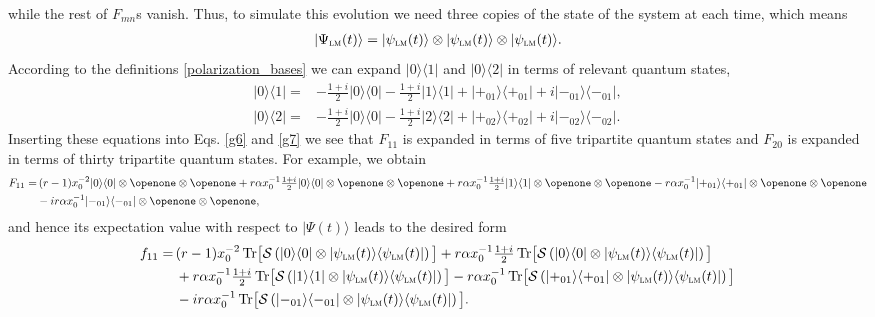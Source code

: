 \documentclass[aps,pra,twocolumn,floatfix,groupedaddress,superscriptaddress,nofootinbib,notitlepage]{revtex4-2}
\begin{document}
while the rest of $F_{mn}$s vanish. 
Thus, to simulate this evolution we need three copies of the state of the system at each time, which means
\begin{align}
|\Psi_{\textsc{lm}} (t) \rangle = |\psi_{\textsc{lm}}(t)\rangle \otimes |\psi_{\textsc{lm}}(t)\rangle \otimes |\psi_{\textsc{lm}}(t)\rangle.
\end{align}
According to the definitions \eqref{polarization_bases} we can expand $|0\rangle\langle 1|$ and $|0\rangle\langle 2|$ in terms of relevant quantum states,
\begin{align}
|0\rangle\langle 1|=&-\textstyle{\frac{1+i}{2}} |0 \rangle \langle 0| -\frac{1+i}{2} |1\rangle\langle 1| + |+_{01} \rangle \langle +_{01}| + i |-_{01}\rangle  \langle -_{01} |,\nonumber\\
|0\rangle\langle 2|=& -\textstyle{\frac{1+i}{2}} |0 \rangle \langle 0| -\frac{1+i}{2} |2\rangle \langle 2| + |+_{02} \rangle \langle +_{02}| + i |-_{02} \rangle \langle -_{02}|.
\end{align}
Inserting these equations into Eqs. \eqref{g6} and \eqref{g7} we see that $F_{11}$ is expanded in terms of five tripartite quantum states and $F_{20}$ is expanded in terms of thirty tripartite quantum states. For example, we obtain
\begin{align}
F_{11} = & \, (r-1) x_{0}^{-2}|0 \rangle \langle 0|\otimes \openone\otimes \openone +r \alpha x_{0}^{-1} \textstyle{\frac{1+i}{2}} |0\rangle \langle 0| \otimes \openone\otimes \openone + r \alpha x_{0}^{-1} \frac{1+i}{2} |1 \rangle \langle 1| \otimes \openone \otimes \openone-r \alpha x_{0}^{-1}|+_{01} \rangle \langle +_{01}| \otimes \openone \otimes \openone \nonumber\\
&- i r \alpha x_{0}^{-1} |-_{01} \rangle \langle -_{01}|\otimes \openone \otimes \openone,
\end{align}
and hence its expectation value with respect to $|\Psi(t)\rangle$ leads to the desired form
\begin{align}
f_{11}=&\, (r-1) x_{0}^{-2} \,\mathrm{Tr} \big[\mathcal{S} \left( |0\rangle\langle 0|\otimes |\psi_{\textsc{lm}}(t)\rangle \langle\psi_{\textsc{lm}}(t)| \right) \big]+ r \alpha x_{0}^{-1} \textstyle{\frac{1+i}{2}} \,\mathrm{Tr} \big[ \mathcal{S} \left(|0 \rangle \langle 0| \otimes |\psi_{\textsc{lm}}(t) \rangle \langle \psi_{\textsc{lm}}(t)| \right) \big] \nonumber\\
&\, + r \alpha x_{0}^{-1} \textstyle{\frac{1+i}{2}} \,\mathrm{Tr} \big[ \mathcal{S} \left(|1 \rangle \langle 1| \otimes |\psi_{\textsc{lm}}(t) \rangle \langle \psi_{\textsc{lm}}(t)| \right)\big] - r \alpha x_{0}^{-1} \,\mathrm{Tr} \big[ \mathcal{S} \left(|+_{01}\rangle \langle +_{01}|\otimes |\psi_{\textsc{lm}} (t) \rangle\langle\psi_{\textsc{lm}}(t) |\right) \big] \nonumber\\
&\, - i r \alpha x_{0}^{-1} \,\mathrm{Tr} \big[ \mathcal{S} \left(|-_{01}\rangle\langle -_{01}|\otimes |\psi_{\textsc{lm}}(t) \rangle \langle \psi_{\textsc{lm}}(t)|\right) \big].
\end{align}
\end{document}
